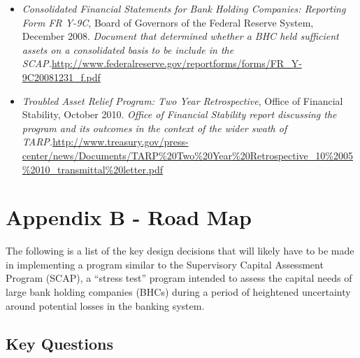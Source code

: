 \documentclass[justified, nobib]{tufte-handout2}
\begin{document}
\begin{itemize}
\item
\emph{Consolidated
  Financial Statements for Bank Holding Companies: Reporting Form FR
  Y-9C}, Board of Governors of the Federal Reserve System, December
  2008. \emph{Document that determined whether a BHC held sufficient
  assets on a consolidated basis to be include in the SCAP.}\url{http://www.federalreserve.gov/reportforms/forms/FR_Y-9C20081231_f.pdf}
\item
\emph{Troubled
  Asset Relief Program: Two Year Retrospective}, Office of Financial
  Stability, October 2010. \emph{Office of Financial Stability report
  discussing the program and its outcomes in the context of the wider
  swath of TARP.}\url{http://www.treasury.gov/press-center/news/Documents/TARP\%20Two\%20Year\%20Retrospective_10\%2005\%2010_transmittal\%20letter.pdf}
\end{itemize}

\section{Appendix B - Road Map}

The following is a list of the key design decisions that will likely have to be made in implementing a program similar to the Supervisory Capital Assessment Program (SCAP), a ``stress test'' program intended to assess the capital needs of large bank holding companies (BHCs) during a period of heightened uncertainty around potential losses in the banking system.

\subsection{Key Questions}
\end{document}
